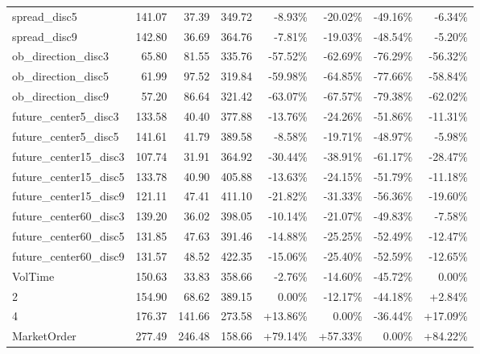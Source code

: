 \begin{table}[ht]
{\begin{tabular}{|lRRR|RRRR|}
spread\_disc5                 &    141.07 &   37.39 &  349.72 &   -8.93\% &  -20.02\% &  -49.16\% &       -6.34\% \\
spread\_disc9                 &    142.80 &   36.69 &  364.76 &   -7.81\% &  -19.03\% &  -48.54\% &       -5.20\% \\
\midrule
ob\_direction\_disc3           &     65.80 &   81.55 &  335.76 &  -57.52\% &  -62.69\% &  -76.29\% &      -56.32\% \\
ob\_direction\_disc5           &     61.99 &   97.52 &  319.84 &  -59.98\% &  -64.85\% &  -77.66\% &      -58.84\% \\
ob\_direction\_disc9           &     57.20 &   86.64 &  321.42 &  -63.07\% &  -67.57\% &  -79.38\% &      -62.02\% \\
future\_center5\_disc3         &    133.58 &   40.40 &  377.88 &  -13.76\% &  -24.26\% &  -51.86\% &      -11.31\% \\
future\_center5\_disc5         &    141.61 &   41.79 &  389.58 &   -8.58\% &  -19.71\% &  -48.97\% &       -5.98\% \\
future\_center15\_disc3        &    107.74 &   31.91 &  364.92 &  -30.44\% &  -38.91\% &  -61.17\% &      -28.47\% \\
future\_center15\_disc5        &    133.78 &   40.90 &  405.88 &  -13.63\% &  -24.15\% &  -51.79\% &      -11.18\% \\
future\_center15\_disc9        &    121.11 &   47.41 &  411.10 &  -21.82\% &  -31.33\% &  -56.36\% &      -19.60\% \\
future\_center60\_disc3        &    139.20 &   36.02 &  398.05 &  -10.14\% &  -21.07\% &  -49.83\% &       -7.58\% \\
future\_center60\_disc5        &    131.85 &   47.63 &  391.46 &  -14.88\% &  -25.25\% &  -52.49\% &      -12.47\% \\
future\_center60\_disc9        &    131.57 &   48.52 &  422.35 &  -15.06\% &  -25.40\% &  -52.59\% &      -12.65\% \\
\midrule
VolTime                      &    150.63 &   33.83 &  358.66 &   -2.76\% &  -14.60\% &  -45.72\% &        0.00\% \\
2                            &    154.90 &   68.62 &  389.15 &    0.00\% &  -12.17\% &  -44.18\% &        +2.84\% \\
4                            &    176.37 &  141.66 &  273.58 &   +13.86\% &    0.00\% &  -36.44\% &       +17.09\% \\
MarketOrder                  &    277.49 &  246.48 &  158.66 &   +79.14\% &   +57.33\% &    0.00\% &       +84.22\% \\
\bottomrule
\end{tabular}
}


\end{table}
